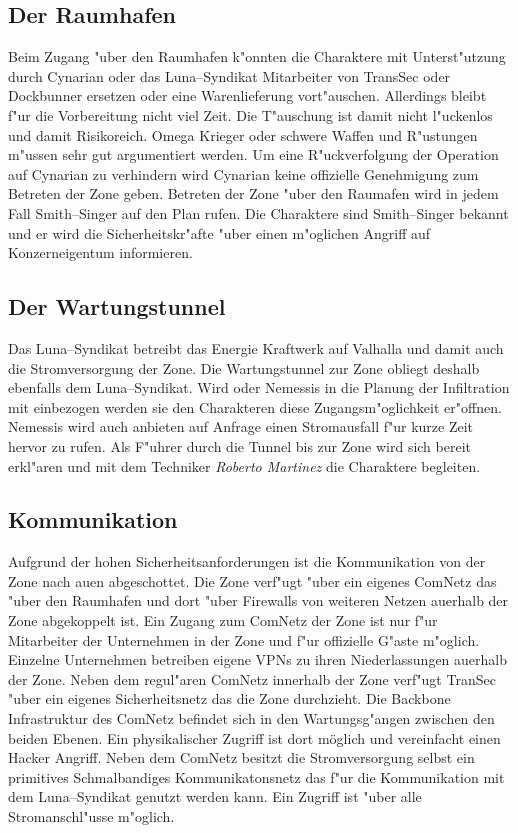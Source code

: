 \subsection{Der Raumhafen} 
Beim Zugang "uber den Raumhafen k"onnten die Charaktere mit Unterst"utzung durch Cynarian oder das Luna--Syndikat Mitarbeiter von TransSec oder Dockbunner ersetzen oder eine Warenlieferung vort"auschen. Allerdings bleibt f"ur die Vorbereitung nicht viel Zeit. Die T"auschung ist damit nicht l"uckenlos und damit Risikoreich. Omega Krieger oder schwere Waffen und R"ustungen m"ussen sehr gut argumentiert werden. Um eine R"uckverfolgung der Operation auf Cynarian zu verhindern wird Cynarian keine offizielle Genehmigung zum Betreten der Zone geben. Betreten der Zone "uber den Raumafen wird in jedem Fall Smith--Singer auf den Plan rufen. Die Charaktere sind Smith--Singer bekannt und er wird die Sicherheitskr"afte "uber einen m"oglichen Angriff auf Konzerneigentum informieren. 

\subsection{Der Wartungstunnel} 
Das Luna--Syndikat betreibt das Energie Kraftwerk auf Valhalla und damit auch die Stromversorgung der Zone. Die Wartungstunnel zur Zone obliegt deshalb ebenfalls dem Luna--Syndikat. Wird \xl{} oder Nemessis in die Planung der Infiltration mit einbezogen werden sie den Charakteren diese Zugangsm"oglichkeit er"offnen. Nemessis wird auch anbieten auf Anfrage einen Stromausfall f"ur kurze Zeit hervor zu rufen. Als F"uhrer durch die Tunnel bis zur Zone wird sich \xl{} bereit erkl"aren und mit dem Techniker \emph{Roberto Martinez} die Charaktere begleiten.

\subsection{Kommunikation} 
Aufgrund der hohen Sicherheitsanforderungen ist die Kommunikation von der Zone nach au\3en abgeschottet. Die Zone verf"ugt "uber ein eigenes ComNetz das "uber den Raumhafen und dort "uber Firewalls von weiteren Netzen au\3erhalb der Zone abgekoppelt ist. Ein Zugang zum ComNetz der Zone ist nur f"ur Mitarbeiter der Unternehmen in der Zone und f"ur offizielle G"aste m"oglich. Einzelne Unternehmen betreiben eigene VPNs zu ihren Niederlassungen au\3erhalb der Zone. Neben dem regul"aren ComNetz innerhalb der Zone verf"ugt TranSec "uber ein eigenes Sicherheitsnetz das die Zone durchzieht. Die Backbone Infrastruktur des ComNetz befindet sich in den Wartungsg"angen zwischen den beiden Ebenen. Ein physikalischer Zugriff ist dort möglich und vereinfacht einen Hacker Angriff. Neben dem ComNetz besitzt die Stromversorgung selbst ein primitives Schmalbandiges Kommunikatonsnetz das f"ur die Kommunikation mit dem Luna--Syndikat genutzt werden kann. Ein Zugriff ist "uber alle Stromanschl"usse m"oglich.

